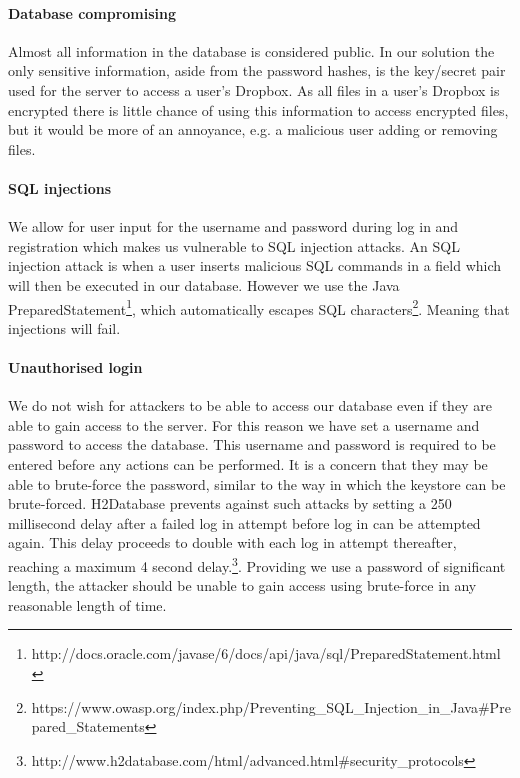 \documentclass[12pt, titlepage]{article}
\begin{document}
\paragraph*{Database compromising} Almost all information in the database is considered public. In our solution the only sensitive information, aside from the password hashes, is the key/secret pair used for the server to access a user's Dropbox. As all files in a user's Dropbox is encrypted there is little chance of using this information to access encrypted files, but it would be more of an annoyance, e.g. a malicious user adding or removing files.

\paragraph*{SQL injections} We allow for user input for the username and password during log in and registration which makes us vulnerable to SQL injection attacks. An SQL injection attack is when a user inserts malicious SQL commands in a field which will then be executed in our database. However we use the Java PreparedStatement\footnote{http://docs.oracle.com/javase/6/docs/api/java/sql/PreparedStatement.html}, which automatically escapes SQL characters\footnote{https://www.owasp.org/index.php/Preventing\_SQL\_Injection\_in\_Java\#Prepared\_Statements}. Meaning that injections will fail. 

\paragraph*{Unauthorised login} We do not wish for attackers to be able to access our database even if they are able to gain access to the server. For this reason we have set a username and password to access the database. This username and password is required to be entered before any actions can be performed. It is a concern that they may be able to brute-force the password, similar to the way in which the keystore can be brute-forced. H2Database prevents against such attacks by setting a 250 millisecond delay after a failed log in attempt before log in can be attempted again. This delay proceeds to double with each log in attempt thereafter, reaching a maximum 4 second delay.\footnote{http://www.h2database.com/html/advanced.html\#security\_protocols}. Providing we use a password of significant length, the attacker should be unable to gain access using brute-force in any reasonable length of time.
\end{document}
